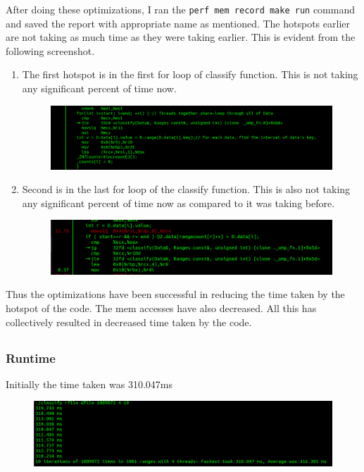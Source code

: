 \documentclass{article}
\begin{document}
After doing these optimizations, I ran the \texttt{perf mem record make run} command and saved the report with appropriate name as mentioned. The hotspots earlier are not taking as much time as they were taking earlier. This is evident from the following screenshot.
\begin{enumerate}
    \item The first hotspot is in the first for loop of classify function. This is not taking any significant percent of time now.
    \begin{figure}[H]
        \centering
        \includegraphics[width=1\textwidth]{images/upper_loop.png}
        \end{figure}
    \item Second is in the last for loop of the classify function. This is also not taking any significant percent of time now as compared to it was taking before.
    \begin{figure}[H]
    \centering
    \includegraphics[width=1\textwidth]{images/lower_loop.png}
    \end{figure}
    
\end{enumerate}
Thus the optimizations have been successful in reducing the time taken by the hotspot of the code. The mem accesses have also decreased. All this has collectively resulted in decreased time taken by the code.




\subsection{}

\subsubsection{Runtime}

Initially the time taken was 310.047ms
\begin{figure}[H]
\centering
\includegraphics[width=1\textwidth]{images/316.png}
\end{figure}
\end{document}

